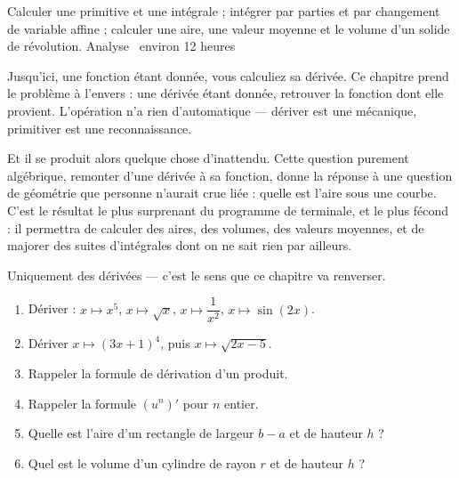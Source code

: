   {Calculer une primitive et une intégrale ; intégrer par parties et par
   changement de variable affine ; calculer une aire, une valeur moyenne et le
   volume d'un solide de révolution.}
  {Analyse \textbullet\ environ 12 heures}

Jusqu'ici, une fonction étant donnée, vous calculiez sa dérivée. Ce chapitre
prend le problème à l'envers : une dérivée étant donnée, retrouver la fonction
dont elle provient. L'opération n'a rien d'automatique — dériver est une
mécanique, primitiver est une reconnaissance.

Et il se produit alors quelque chose d'inattendu. Cette question purement
algébrique, remonter d'une dérivée à sa fonction, donne la réponse à une
question de géométrie que personne n'aurait crue liée : quelle est l'aire
sous une courbe. C'est le résultat le plus surprenant du programme de
terminale, et le plus fécond : il permettra de calculer des aires, des
volumes, des valeurs moyennes, et de majorer des suites d'intégrales dont on
ne sait rien par ailleurs.

\begin{revision}
Uniquement des dérivées — c'est le sens que ce chapitre va renverser.

\begin{enumerate}[label=\textbf{\arabic*.}, leftmargin=*, itemsep=0.35em]
  \item Dériver : $x \mapsto x^{5}$, $x \mapsto \sqrt{x}$,
        $x \mapsto \dfrac{1}{x^{2}}$, $x \mapsto \sin(2x)$.
  \item Dériver $x \mapsto (3x+1)^{4}$, puis $x \mapsto \sqrt{2x-5}$.
  \item Rappeler la formule de dérivation d'un produit.
  \item Rappeler la formule $\left(u^{n}\right)'$ pour $n$ entier.
  \item Quelle est l'aire d'un rectangle de largeur $b-a$ et de hauteur $h$ ?
  \item Quel est le volume d'un cylindre de rayon $r$ et de hauteur $h$ ?
\end{enumerate}
\end{revision}

